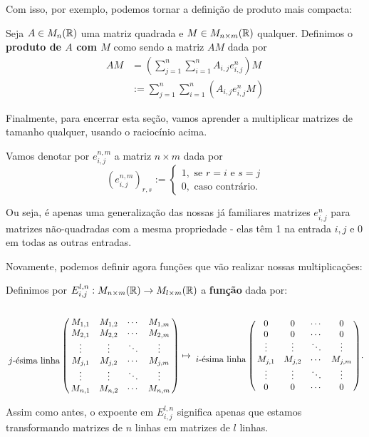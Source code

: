 Com isso, por exemplo, podemos tornar a definição de produto mais compacta:
\begin{df}
	Seja $A\in M_n(\mathbb R)$ uma matriz quadrada e $M\in M_{n\times m}(\mathbb R)$ qualquer. Definimos o \textbf{produto de $A$ com $M$} como sendo a matriz $AM$ dada por
	\begin{align*}
	AM&=\left(\sum_{j=1}^n\sum_{i=1}^nA_{i,j}e^n_{i,j}\right)M\\&:=\sum_{j=1}^n\sum_{i=1}^n\left(A_{i,j}e^n_{i,j}M\right)
	\end{align*}
\end{df}

\bigskip

Finalmente, para encerrar esta seção, vamos aprender a multiplicar matrizes de tamanho qualquer, usando o raciocínio acima.

\begin{df}
	Vamos denotar por $e_{i,j}^{n,m}$ a matriz $n\times m$ dada por
	\[(e^{n,m}_{i,j})_{r,s}:=\begin{cases}
	1,\text{ se } r=i \text{ e } s=j\\
	0, \text{ caso contrário}.
	\end{cases}\]
\end{df}

Ou seja, é apenas uma generalização das nossas já familiares matrizes $e^n_{i,j}$ para matrizes não-quadradas com a mesma propriedade - elas têm 1 na entrada $i,j$ e 0 em todas as outras entradas.

Novamente, podemos definir agora funções que vão realizar nossas multiplicações:
\begin{df}
	Definimos por $E^{l,n}_{i,j}:M_{n\times m}(\mathbb R)\to M_{l\times m}(\mathbb R)$ a \textbf{função} dada por:
	\[\bordermatrix{&&&&\cr
		&M_{1,1} & M_{1,2} & \cdots & M_{1,m}\cr
		& M_{2,1}& M_{2,2} & \cdots & M_{2,m}\cr
		& \vdots & \vdots & \ddots & \vdots\cr		
		j\text{-ésima linha}& M_{j,1} & M_{j,2} & \cdots & M_{j,m}\cr
		& \vdots & \vdots & \ddots & \vdots\cr
		&M_{n,1} & M_{n,2} & \cdots & M_{n,m}	
	}\mapsto
	\bordermatrix{
		&&&&\cr
		&0&0&\cdots&0\cr
		&0&0&\cdots&0\cr
		& \vdots & \vdots & \ddots & \vdots\cr
		i\text{-ésima linha}& M_{j,1} & M_{j,2} & \cdots & M_{j,m}\cr
		& \vdots & \vdots & \ddots & \vdots\cr
		&0&0&\cdots&0
	}.
	\]
\end{df}

\begin{rmk}
	Assim como antes, o expoente em $E^{l,n}_{i,j}$ significa apenas que estamos transformando matrizes de $n$ linhas em matrizes de $l$ linhas.
\end{rmk}

